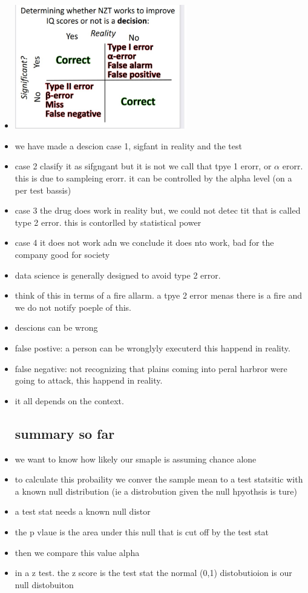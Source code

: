 \documentclass{article}
\begin{document}
\begin{itemize}
\item  \includegraphics[width=7.5cm]{Final_Review/lecture_4/lecture 4 confusion_matrix.jpg}
\item we have made a descion case 1, sigfant in reality and the test 
\item case 2 clasify it as sifgngant but it is not we call that tpye 1 erorr, or $\alpha$ erorr. this is due to sampleing erorr. it can be controlled by the alpha level (on a per test bassis)
\item case 3 the drug does work in reality but, we could not detec tit that is called type 2 error. this is contorlled by statistical power
\item case 4 it does not work adn we conclude it does nto work, bad for the company good for society
\item data science is generally designed to avoid type 2 error. 
\item think of this in terms of a fire allarm. a tpye 2 error menas there is a fire and we do not notify poeple of this. 
\item descions can be wrong 
\item false postive: a person can be wronglyly executerd this happend in reality.
\item false negative: not recognizing that plains coming into peral harbror were going to attack, this happend in reality. 
\item it all depends on the context. 
\subsection{summary so far}
\item we want to know how likely our smaple is assuming chance alone 
\item to calculate this probaility we conver the sample mean to a test statsitic with a known null distribution (ie a distrobution given the null hpyothsis is ture) 
\item a test stat needs a known null distor
\item the p vlaue is the area under this null that is cut off by the test stat 
\item then we compare this value alpha 
\item in a z test. the z score is the test stat the normal (0,1) distobutioion is our null distobuiton 


\end{itemize}
\end{document}
